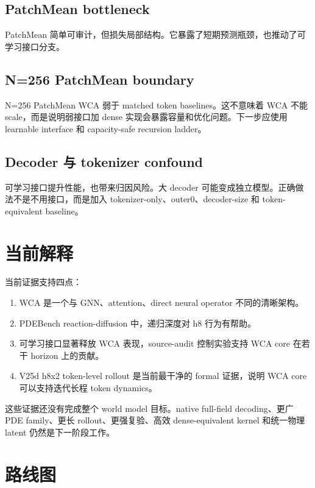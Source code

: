 \documentclass[11pt]{article}
\begin{document}
\subsection{PatchMean bottleneck}

PatchMean 简单可审计，但损失局部结构。它暴露了短期预测瓶颈，也推动了可学习接口分支。

\subsection{N=256 PatchMean boundary}

N=256 PatchMean WCA 弱于 matched token baselines。这不意味着 WCA 不能 scale，而是说明弱接口加 dense 实现会暴露容量和优化问题。下一步应使用 learnable interface 和 capacity-safe recursion ladder。

\subsection{Decoder 与 tokenizer confound}

可学习接口提升性能，也带来归因风险。大 decoder 可能变成独立模型。正确做法不是不用接口，而是加入 tokenizer-only、outer0、decoder-size 和 token-equivalent baseline。

\section{当前解释}

当前证据支持四点：

\begin{enumerate}[leftmargin=2em]
  \item WCA 是一个与 GNN、attention、direct neural operator 不同的清晰架构。
  \item PDEBench reaction-diffusion 中，递归深度对 h8 行为有帮助。
  \item 可学习接口显著释放 WCA 表现，source-audit 控制实验支持 WCA core 在若干 horizon 上的贡献。
  \item V25d h8x2 token-level rollout 是当前最干净的 formal 证据，说明 WCA core 可以支持迭代长程 token dynamics。
\end{enumerate}

这些证据还没有完成整个 world model 目标。native full-field decoding、更广 PDE family、更长 rollout、更强复验、高效 dense-equivalent kernel 和统一物理 latent 仍然是下一阶段工作。

\section{路线图}
\end{document}
